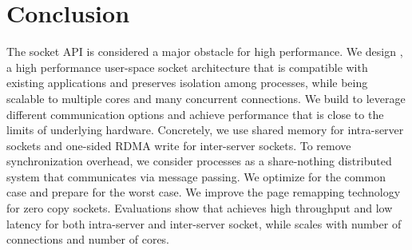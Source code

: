 \section{Conclusion}
\label{sec:conclusion}

The socket API is considered a major obstacle for high performance. We design \sys, a high performance user-space socket architecture that is compatible with existing applications and preserves isolation among processes, while being scalable to multiple cores and many concurrent connections. We build \sys to leverage different communication options and achieve performance that is close to the limits of underlying hardware. Concretely, we use shared memory for intra-server sockets and one-sided RDMA write for inter-server sockets. To remove synchronization overhead, we consider processes as a share-nothing distributed system that communicates via message passing. We optimize for the common case and prepare for the worst case. We improve the page remapping technology for zero copy sockets. Evaluations show that \sys achieves high throughput and low latency for both intra-server and inter-server socket, while scales with number of connections and number of cores.
